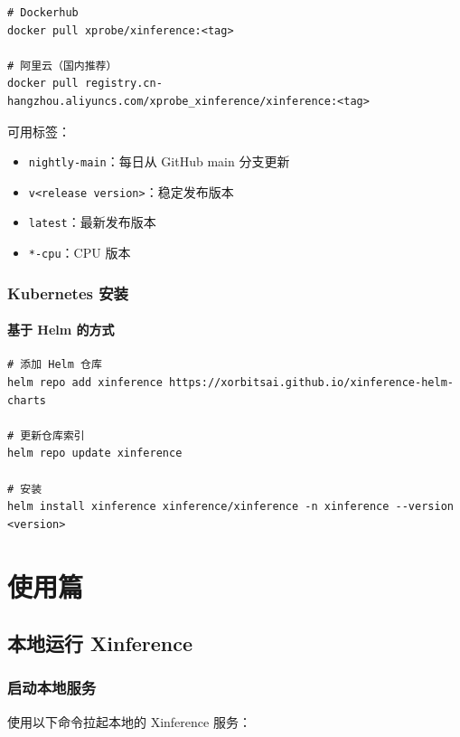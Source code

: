 \documentclass[12pt,UTF8]{ctexbook}
\begin{document}
\begin{lstlisting}
# Dockerhub
docker pull xprobe/xinference:<tag>

# 阿里云（国内推荐）
docker pull registry.cn-hangzhou.aliyuncs.com/xprobe_xinference/xinference:<tag>
\end{lstlisting}

可用标签：
\begin{itemize}[leftmargin=2cm]
    \item \texttt{nightly-main}：每日从 GitHub main 分支更新
    \item \texttt{v<release version>}：稳定发布版本
    \item \texttt{latest}：最新发布版本
    \item \texttt{*-cpu}：CPU 版本
\end{itemize}

\section{Kubernetes 安装}
\label{sec:kubernetes_install}

\subsection{基于 Helm 的方式}

\begin{lstlisting}
# 添加 Helm 仓库
helm repo add xinference https://xorbitsai.github.io/xinference-helm-charts

# 更新仓库索引
helm repo update xinference

# 安装
helm install xinference xinference/xinference -n xinference --version <version>
\end{lstlisting}

\part{使用篇}

\chapter{本地运行 Xinference}
\label{chap:local_usage}

\section{启动本地服务}
\label{sec:start_local_server}

使用以下命令拉起本地的 Xinference 服务：
\end{document}
